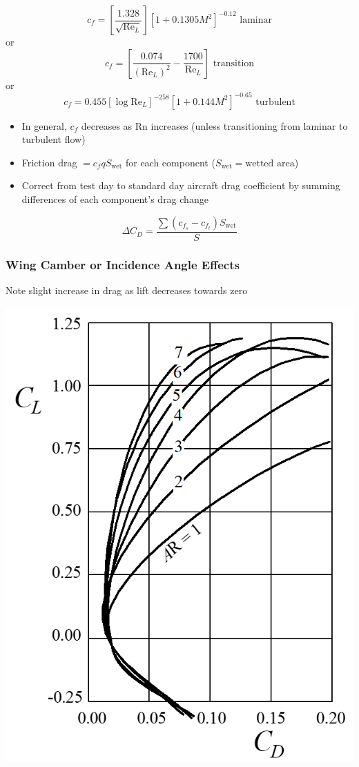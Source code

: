 \documentclass[
]{book}
\providecommand{\tightlist}{%
  \setlength{\itemsep}{0pt}\setlength{\parskip}{0pt}}
\begin{document}
\[c_f = \left[\frac{1.328}{\sqrt{\mathrm{Re}_L}}\right] \left[1 + 0.1305 M^2 \right]^{-0.12} \text{ laminar}\]
or
\[c_f = \left[\frac{0.074}{\left(\mathrm{Re}_L\right)^2} - \frac{1700}{\mathrm{Re}_L}  \right] \text{ transition}\]
or
\[c_f = 0.455\left[\log \mathrm{Re}_L\right]^{-258} \left[1 + 0.144 M^2\right]^{-0.65} \text{ turbulent}\]

\begin{itemize}
\tightlist
\item
  In general, \(c_f\) decreases as \(\mathrm{Rn}\) increases (unless transitioning from laminar to turbulent flow)
\item
  Friction drag \(= c_f q S_{\mathrm{wet}}\) for each component (\(S_{\mathrm{wet}} = \text{wetted area}\))
\item
  Correct from test day to standard day aircraft drag coefficient by summing differences of each component's drag change
\end{itemize}

\[\Delta C_D = \frac{\sum\left(c_{f_s} - c_{f_t} \right) S_{\mathrm{wet}}}{S} \]

\hypertarget{wing-camber-or-incidence-angle-effects}{%
\subsubsection*{Wing Camber or Incidence Angle Effects}\label{wing-camber-or-incidence-angle-effects}}

Note slight increase in drag as lift decreases towards zero

\includegraphics[width=5.271in,height=6.875in]{media/05/image80.png}
\end{document}
